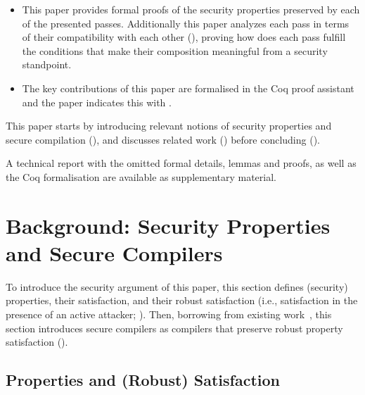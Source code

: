 \documentclass[dvipsnames,conference]{IEEEtran}
\theoremstyle{definition}
\begin{document}
\begin{itemize}
  \item %
  		This paper provides formal proofs of the security properties preserved by each of the presented passes. 
  		Additionally this paper analyzes each pass in terms of their compatibility with each other (), proving how does each pass fulfill the conditions that make their composition meaningful from a security standpoint.

  \item The key contributions of this paper are formalised in the Coq proof assistant and the paper indicates this with \CoqSymbol.
\end{itemize}
% 
This paper starts by introducing relevant notions of security properties and secure compilation (),
and discusses related work () before concluding ().

 A technical report with the omitted formal details, lemmas and proofs, as well as the Coq formalisation are available as supplementary material.













\section{Background: Security Properties and Secure Compilers}\label{sec:background}

To introduce the security argument of this paper, this section defines (security) properties, their satisfaction, and their robust satisfaction (i.e., satisfaction in the presence of an active attacker; ).
Then, borrowing from existing work~\cite{abate2019jour,abate2021extacc}, this section introduces secure compilers as compilers that preserve robust property satisfaction ().

\subsection{Properties and (Robust) Satisfaction}\label{subsec:bg:tprop}
\end{document}
